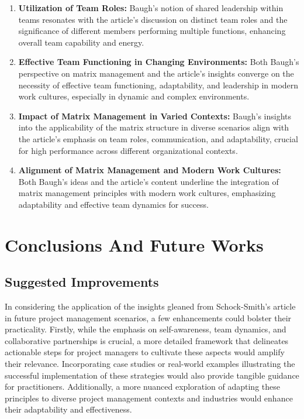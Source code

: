 \documentclass[runningheads]{llncs}
\begin{document}
\begin{enumerate}
    \item \textbf{Utilization of Team Roles:} Baugh's notion of shared leadership within teams resonates with the article's discussion on distinct team roles and the significance of different members performing multiple functions, enhancing overall team capability and energy.
    
    \item \textbf{Effective Team Functioning in Changing Environments:} Both Baugh's perspective on matrix management and the article's insights converge on the necessity of effective team functioning, adaptability, and leadership in modern work cultures, especially in dynamic and complex environments.
    
    \item \textbf{Impact of Matrix Management in Varied Contexts:} Baugh's insights into the applicability of the matrix structure in diverse scenarios align with the article's emphasis on team roles, communication, and adaptability, crucial for high performance across different organizational contexts.
    
    \item \textbf{Alignment of Matrix Management and Modern Work Cultures:} Both Baugh's ideas and the article's content underline the integration of matrix management principles with modern work cultures, emphasizing adaptability and effective team dynamics for success.
\end{enumerate}

\section{Conclusions And Future Works}
\subsection{Suggested Improvements}
In considering the application of the insights gleaned from Schock-Smith's article in future project management scenarios, a few enhancements could bolster their practicality. Firstly, while the emphasis on self-awareness, team dynamics, and collaborative partnerships is crucial, a more detailed framework that delineates actionable steps for project managers to cultivate these aspects would amplify their relevance. Incorporating case studies or real-world examples illustrating the successful implementation of these strategies would also provide tangible guidance for practitioners. Additionally, a more nuanced exploration of adapting these principles to diverse project management contexts and industries would enhance their adaptability and effectiveness.
\end{document}
